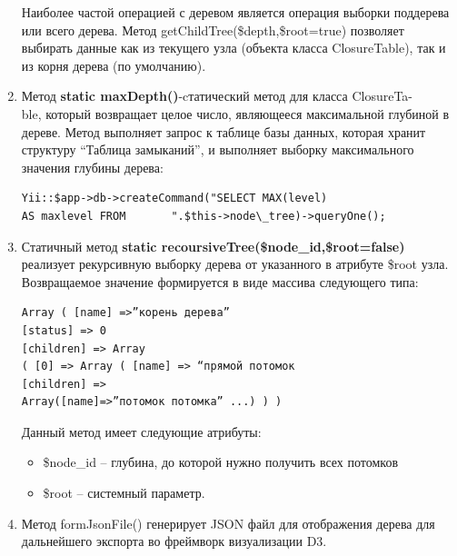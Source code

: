 \documentclass[a4paper,14pt]{extreport}
\theoremstyle{definition}
\begin{document}
\begin{enumerate}
Наиболее частой операцией с деревом является операция выборки поддерева или всего дерева. Метод getChildTree(\$depth,\$root=true) позволяет выбирать данные как из текущего узла (объекта класса ClosureTable), так и из корня дерева (по умолчанию).
\item Метод \textbf{static maxDepth()}-cтатический метод для класса ClosureTa-\\ble, который возвращает целое число, являющееся максимальной глубиной в дереве. Метод выполняет запрос к таблице базы данных, которая хранит структуру “Таблица замыканий”, и выполняет выборку максимального значения глубины дерева:
\begin{verbatim}Yii::$app->db->createCommand("SELECT MAX(level)
AS maxlevel FROM       ".$this->node\_tree)->queryOne();\end{verbatim}
\item Статичный метод \textbf{static recoursiveTree(\$node\_id,\$root=false)} реализует рекурсивную выборку дерева от указанного в атрибуте \$root узла. Возвращаемое значение формируется в виде массива следующего типа:
\begin{verbatim}Array ( [name] =>”корень дерева”
[status] => 0
[children] => Array
( [0] => Array ( [name] => “прямой потомок
[children] =>
Array([name]=>”потомок потомка” ...) ) )\end{verbatim}
Данный метод имеет следующие атрибуты:
\begin{itemize}
\item \$node\_id – глубина, до которой нужно получить всех потомков
\item \$root – системный параметр.
\end{itemize}
\item Метод formJsonFile() генерирует JSON файл для отображения дерева для дальнейшего экспорта во фреймворк визуализации D3.


\end{enumerate}
\end{document}
